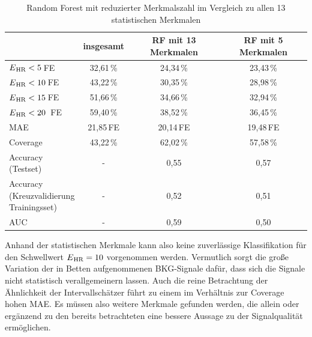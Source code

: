  \begin{table}[H]
 	\centering
  	\begin{tabular}{l || c | c | c}
 																& insgesamt 		& RF mit 13 Merkmalen			& RF mit 5 Merkmalen\\\hline
 		$E\textsubscript{HR} < 5$\,\si{FE} 						& 32{,}61\,\% 		& 24,34\,\%			& 23,43\,\%	\\
 		$E\textsubscript{HR} < 10$\,\si{FE} 						& 43{,}22\,\% 		& 30,35\,\% 		& 28,98\,\%	\\
 		$E\textsubscript{HR} < 15$\,\si{FE} 						& 51{,}66\,\% 		& 34,66\,\% 		& 32,94\,\%	\\
 		$E\textsubscript{HR} < 20$ \,\si{FE}						& 59{,}40\,\% 		& 38,52\,\% 		& 36,45\,\%\\\hline
 		MAE														& 21{,}85\,\si{FE}	& 20,14\,\si{FE}	& 19{,}48\,\si{FE}\\\hline
 		Coverage												& 43{,22}\,\%		& 62,02\,\%			& 57,58\,\%\\\hline
 		\makecell[l]{Accuracy\\(Testset)}						& -					& 0,55				& 0,57\\\hline
 		\makecell[l]{Accuracy\\(Kreuzvalidierung\\Trainingsset)}	& -					& 0{,}52			& 0,51\\\hline
 		AUC														& -					& 0,59				& 0,50
 	\end{tabular}
 	\caption{Random Forest mit reduzierter Merkmalszahl im Vergleich zu allen 13 statistischen Merkmalen}
 	\label{fig:ml-statistical-reduced-comparison}
 \end{table}

Anhand der statistischen Merkmale kann also keine zuverlässige Klassifikation für den Schwellwert $E\textsubscript{HR} = 10$ vorgenommen werden. Vermutlich sorgt die große Variation der in Betten aufgenommenen \ac{BKG}-Signale dafür, dass sich die Signale nicht statistisch verallgemeinern lassen. Auch die reine Betrachtung der Ähnlichkeit der Intervallschätzer führt zu einem im Verhältnis zur Coverage hohen \ac{MAE}. Es müssen also weitere Merkmale gefunden werden, die allein oder ergänzend zu den bereits betrachteten eine bessere Aussage zu der Signalqualität ermöglichen.

